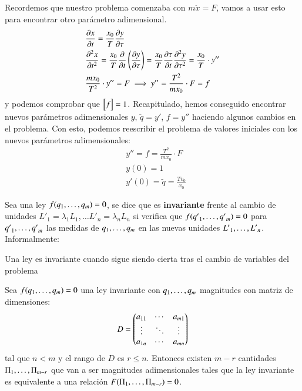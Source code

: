 \begin{eg}
    Recordemos que nuestro problema comenzaba con $m\ddot x = F$, vamos a usar esto para encontrar otro parámetro adimensional.
    \begin{align*}
        &\frac{\partial x}{\partial t} = \frac{x_0}{T} \frac{\partial y}{\partial \tau}\\
        &\frac{\partial^{2} x}{\partial t^{2}} = \frac{x_0}{T} \frac{\partial}{\partial t} \left(\frac{\partial y}{\partial \tau}\right) = \frac{x_0}{T} \frac{\partial \tau}{\partial t} \frac{\partial^{2} y}{\partial \tau^{2}} = \frac{x_0}{T} \cdot y''\\
        & \frac{mx_0}{T^2} \cdot y'' = F \implies y'' = \frac{T^2}{mx_0}\cdot F = f
    \end{align*}
    y podemos comprobar que $\mx{f} = 1$. Recapitulado, hemos conseguido encontrar nuevos parámetros adimensionales $y$, $\tilde q = y'$, $f = y''$ haciendo algunos cambios en el problema. Con esto, podemos reescribir el problema de valores iniciales con los nuevos parámetros adimensionales:
    \begin{align*}
        &y'' = f = \frac{T^2}{mx_0}\cdot F\\
        &y(0) = 1\\
        &y'(0) = \tilde q = \frac{T v_0}{x_0}
    \end{align*}
\end{eg}

\begin{dfn}
    Sea una ley $f({q}_{1}, \ldots, {q}_{m}) = 0$, se dice que es \textbf{invariante} frente al cambio de unidades $L'_1 = \lambda_1 L_1, \ldots L'_n = \lambda_n L_n$ si verifica que $f({q'}_{1}, \ldots, {q'}_{m}) = 0$ para ${q'}_{1}, \ldots, {q'}_{m}$ las medidas de ${q}_{1}, \ldots, {q}_{m}$ en las nuevas unidades ${L'}_{1}, \ldots, {L'}_{n}$. Informalmente:\\
    \begin{center}
        Una ley es invariante cuando sigue siendo cierta tras el cambio de variables del problema
    \end{center}
\end{dfn}

\begin{thm}[Teorema $\Pi$]
    Sea $f({q}_{1}, \ldots, {q}_{m}) = 0$ una ley invariante con ${q}_{1}, \ldots, {q}_{m}$ magnitudes con matriz de dimensiones:
    $$
        D = \dmx{
            a_{11} & \cdots & a_{m1}\\
            \vdots & \ddots & \vdots\\
            a_{1n} & \cdots & a_{mn}
        }
    $$
    tal que $n < m$ y el rango de $D$ es $r \leq n$. Entonces existen $m - r$ cantidades ${\Pi}_{1}, \ldots, {\Pi}_{m-r}$ que van a ser magnitudes adimensionales tales que la ley invariante es equivalente a una relación $F({\Pi}_{1}, \ldots, {\Pi}_{m-r}) = 0$.
\end{thm}
